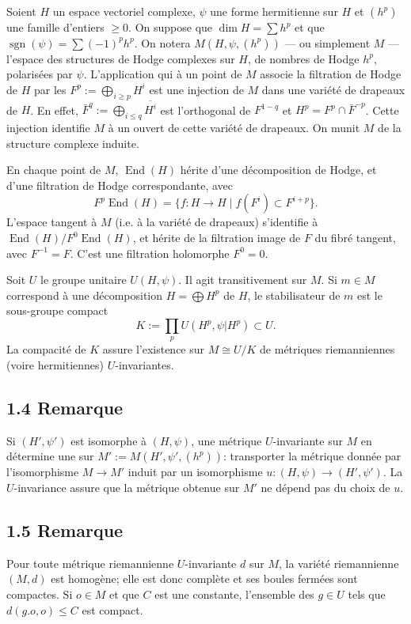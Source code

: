 \documentclass[12pt,a4paper]{article}
\theoremstyle{plain}
\theoremstyle{definition}
\DeclareMathOperator{\End}{End}
\DeclareMathOperator{\sgn}{sgn}
\begin{document}
Soient $H$ un espace vectoriel complexe, $\psi$ une forme hermitienne sur $H$ et $(h^{p})$ une famille d'entiers $\geq 0$. On suppose que $\dim H = \sum h^{p}$ et que $\sgn(\psi) = \sum (-1)^{p} h^{p}$. On notera $M(H, \psi, (h^{p}))$ --- ou simplement $M$ --- l'espace des structures de Hodge complexes sur $H$, de nombres de Hodge $h^{p}$, polaris\'{e}es par $\psi$. L'application qui \`{a} un point de $M$ associe la filtration de Hodge de $H$ par les $F^{p} := \bigoplus_{i \geq p} H^{i}$ est une injection de $M$ dans une vari\'{e}t\'{e} de drapeaux de $H$. En effet, $\bar{F}^{q} := \bigoplus_{i \leq q} \overline{H^{i}}$ est l'orthogonal de $F^{1-q}$ et $H^{p} = F^{p} \cap \bar{F}^{-p}$. Cette injection identifie $M$ \`{a} un ouvert de cette vari\'{e}t\'{e} de drapeaux. On munit $M$ de la structure complexe induite.

En chaque point de $M$, $\End(H)$ h\'{e}rite d'une d\'{e}composition de Hodge, et d'une filtration de Hodge correspondante, avec
\[
F^{p}\End(H) = \{f : H \to H \mid f(F^{i}) \subset F^{i+p}\}.
\]
L'espace tangent \`{a} $M$ (i.e. \`{a} la vari\'{e}t\'{e} de drapeaux) s'identifie \`{a} $\End(H)/F^{0}\End(H)$, et h\'{e}rite de la filtration image de $F$ du fibr\'{e} tangent, avec $F^{-1} = F$. C'est une filtration holomorphe $F^{0} = 0$.

Soit $U$ le groupe unitaire $U(H, \psi)$. Il agit transitivement sur $M$. Si $m \in M$ correspond \`{a} une d\'{e}composition $H = \bigoplus H^{p}$ de $H$, le stabilisateur de $m$ est le sous-groupe compact
\[
K := \prod_{p} U(H^{p}, \psi|H^{p}) \subset U.
\]
La compacit\'{e} de $K$ assure l'existence sur $M \cong U/K$ de m\'{e}triques riemanniennes (voire hermitiennes) $U$-invariantes.

\subsection*{1.4 Remarque}
Si $(H', \psi')$ est isomorphe \`{a} $(H, \psi)$, une m\'{e}trique $U$-invariante sur $M$ en d\'{e}termine une sur $M' := M(H', \psi', (h^{p}))$: transporter la m\'{e}trique donn\'{e}e par l'isomorphisme $M \to M'$ induit par un isomorphisme $u : (H, \psi) \to (H', \psi')$. La $U$-invariance assure que la m\'{e}trique obtenue sur $M'$ ne d\'{e}pend pas du choix de $u$.

\subsection*{1.5 Remarque}
Pour toute m\'{e}trique riemannienne $U$-invariante $d$ sur $M$, la vari\'{e}t\'{e} riemannienne $(M, d)$ est homog\`{e}ne; elle est donc compl\`{e}te et ses boules ferm\'{e}es sont compactes. Si $o \in M$ et que $C$ est une constante, l'ensemble des $g \in U$ tels que $d(g.o, o) \leq C$ est compact.
\end{document}
